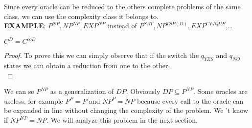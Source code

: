 Since every oracle can be reduced to the others complete problems of the same class, we can use the complexity class it belongs to.\\
\textbf{EXAMPLE}: $P^{NP}, NP^{NP}, EXP^{NP}$ instead of $P^{SAT}, NP^{TSP(D)}, EXP^{CLIQUE}$,\dots
\begin{defbox}[Proposition]
  $C^D=C^{coD}$
\end{defbox}
\begin{proof}
  To prove this we can simply observe that if the switch the $q_{YES}$ and $q_{NO}$ states we can obtain a reduction from one to the other.\\
\end{proof}
We can se $P^{NP}$ as a generalization of $DP$. Obviously  $DP \subseteq P^{NP}$.
Some oracles are useless, for example $P^{P} = P$ and $NP^{P} = NP$ because every call to the oracle can be expanded in line without changing the complexity of the problem. We 't know if $NP^{NP} = NP$. We will analyze this problem in the next section.




